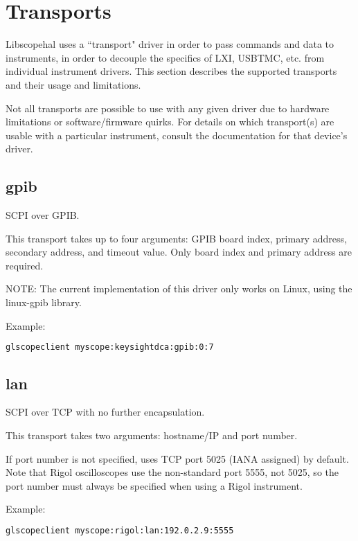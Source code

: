 \chapter{Transports}
\label{sec:transports}

Libscopehal uses a ``transport" driver in order to pass commands and data to instruments, in order to decouple the
specifics of LXI, USBTMC, etc. from individual instrument drivers. This section describes the supported transports and
their usage and limitations.

Not all transports are possible to use with any given driver due to hardware limitations or software/firmware quirks.
For details on which transport(s) are usable with a particular instrument, consult the documentation for that device's
driver.

\section{gpib}

SCPI over GPIB.

This transport takes up to four arguments: GPIB board index, primary address, secondary address, and timeout value.
Only board index and primary address are required.

NOTE: The current implementation of this driver only works on Linux, using the linux-gpib library.

Example:
\begin{lstlisting}[language=sh, numbers=none]
glscopeclient myscope:keysightdca:gpib:0:7
\end{lstlisting}

\section{lan}

SCPI over TCP with no further encapsulation.

This transport takes two arguments: hostname/IP and port number.

If port number is not specified, uses TCP port 5025 (IANA assigned) by default. Note that Rigol oscilloscopes use the
non-standard port 5555, not 5025, so the port number must always be specified when using a Rigol instrument.

Example:
\begin{lstlisting}[language=sh, numbers=none]
glscopeclient myscope:rigol:lan:192.0.2.9:5555
\end{lstlisting}


